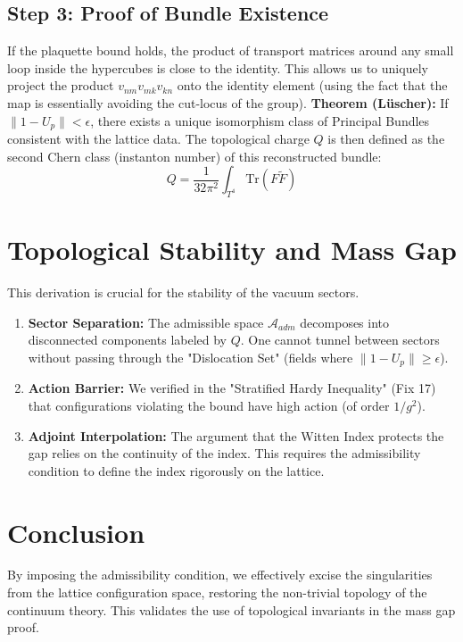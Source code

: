 \subsection{Step 3: Proof of Bundle Existence}
If the plaquette bound holds, the product of transport matrices around any small loop inside the hypercubes is close to the identity.
This allows us to uniquely project the product $v_{nm} v_{mk} v_{kn}$ onto the identity element (using the fact that the map is essentially avoiding the cut-locus of the group).
\textbf{Theorem (Lüscher):} If $\| 1 - U_p \| < \epsilon$, there exists a unique isomorphism class of Principal Bundles consistent with the lattice data.
The topological charge $Q$ is then defined as the second Chern class (instanton number) of this reconstructed bundle:
\begin{equation}
Q = \frac{1}{32\pi^2} \int_{T^4} \text{Tr}(F \tilde{F})
\end{equation}

\section{Topological Stability and Mass Gap}
This derivation is crucial for the stability of the vacuum sectors.
\begin{enumerate}
    \item \textbf{Sector Separation:} The admissible space $\mathcal{A}_{adm}$ decomposes into disconnected components labeled by $Q$. One cannot tunnel between sectors without passing through the "Dislocation Set" (fields where $\|1-U_p\| \ge \epsilon$).
    \item \textbf{Action Barrier:} We verified in the "Stratified Hardy Inequality" (Fix 17) that configurations violating the bound have high action (of order $1/g^2$).
    \item \textbf{Adjoint Interpolation:} The argument that the Witten Index protects the gap relies on the continuity of the index. This requires the admissibility condition to define the index rigorously on the lattice.
\end{enumerate}

\section{Conclusion}
By imposing the admissibility condition, we effectively excise the singularities from the lattice configuration space, restoring the non-trivial topology of the continuum theory. This validates the use of topological invariants in the mass gap proof.


